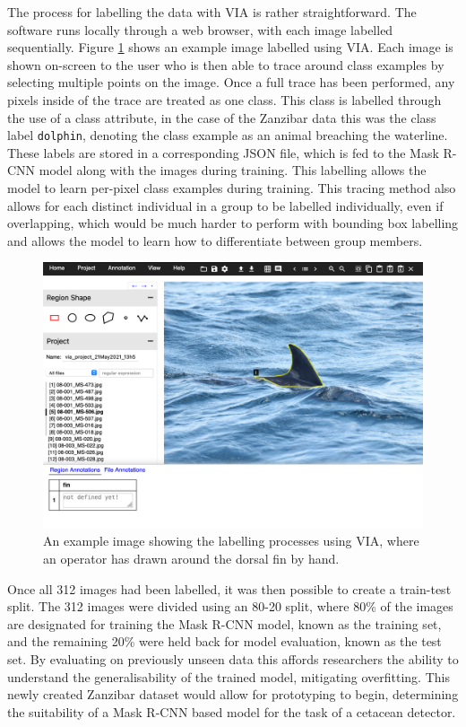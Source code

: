 The process for labelling the data with VIA is rather straightforward. The software runs locally through a web browser, with each image labelled sequentially. Figure \ref{fig:via-json-example-zanzibar} shows an example image labelled using VIA. Each image is shown on-screen to the user who is then able to trace around class examples by selecting multiple points on the image. Once a full trace has been performed, any pixels inside of the trace are treated as one class. This class is labelled through the use of a class attribute, in the case of the Zanzibar data this was the class label \texttt{dolphin}, denoting the class example as an animal breaching the waterline. These labels are stored in a corresponding JSON file, which is fed to the Mask R-CNN model along with the images during training. This labelling allows the model to learn per-pixel class examples during training. This tracing method also allows for each distinct individual in a group to be labelled individually, even if overlapping, which would be much harder to perform with bounding box labelling and allows the model to learn how to differentiate between group members.  

  \begin{figure}
	\begin{center}
		\includegraphics[scale=0.4]{Chapter3/figs/via-json-example-zanzibar-1.png}
	\end{center}
	\caption{An example image showing the labelling processes using VIA, where an operator has drawn around the dorsal fin by hand.
	}
	\label{fig:via-json-example-zanzibar}
\end{figure}

Once all 312 images had been labelled, it was then possible to create a train-test split. The 312 images were divided using an 80-20 split, where 80\% of the images are designated for training the Mask R-CNN model, known as the training set, and the remaining 20\% were held back for model evaluation, known as the test set. By evaluating on previously unseen data this affords researchers the ability to understand the generalisability of the trained model, mitigating overfitting. This newly created Zanzibar dataset would allow for prototyping to begin, determining the suitability of a Mask R-CNN based model for the task of a cetacean detector. 

